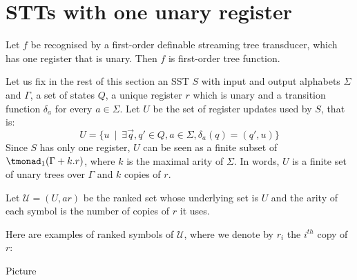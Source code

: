 \section{STTs with one unary register}
\label{sec:one-register-appendix}



\begin{lemma}\label{lem:one-register}
    Let $f$ be recognised by a first-order definable streaming tree transducer, which has one register that is unary. Then $f$ is first-order tree function.
\end{lemma}

Let us fix in the rest of this section an SST $S$ with input and output alphabets $\Sigma$ and $\Gamma$, a set of states $Q$, a unique register $r$ which is unary and a transition function $\delta_a$ for every $a\in \Sigma$. Let $U$ be the set of register updates used by $S$, that is:
$$U=\{u\ \mid\  \exists \vec{q}, q' \in Q, a\in \Sigma, \delta_a(q)=(q',u)\}$$
Since $S$ has only one register,  $U$ can be seen as a finite subset of  $\tmonad_1( \Gamma + k.r)$, where $k$ is the maximal arity of $\Sigma$.
In words, $U$ is a finite set of unary trees over $\Gamma$ and $k$ copies of $r$.

Let $\mathcal{U}=(U,ar)$ be the ranked set whose underlying set is $U$ and the arity of each symbol is the number of copies of $r$ it uses. 

Here are examples of ranked symbols of $\mathcal{U}$, where we denote by $r_i$ the $i^{th}$ copy of $r$:
\begin{center}
Picture
\end{center}

